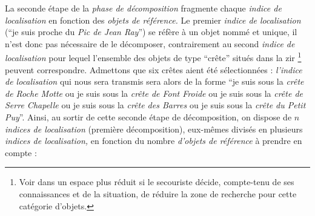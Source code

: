 La seconde étape de la \emph{phase de décomposition} fragmente chaque
\emph{indice de localisation} en fonction des \emph{objets de
  référence.} Le premier \emph{indice de localisation} (\enquote{je
  suis proche du \emph{Pic de Jean Ray}}) se réfère à un objet nommé
et unique, il n'est donc pas nécessaire de le décomposer,
contrairement au second \emph{indice de localisation} pour lequel
l'ensemble des objets de type \enquote{crête} situés dans la \ac{zir}
\footnote{Voir dans un espace plus réduit si le secouriste décide,
  compte-tenu de ses connaissances et de la situation, de réduire la
  zone de recherche pour cette catégorie d'objets.} peuvent
correspondre. Admettons que six crêtes aient été sélectionnées :
\emph{l'indice de localisation} qui nous sera transmis sera alors de
la forme \enquote{je suis sous la \emph{crête de Roche Motte} ou je
  suis sous la \emph{crête de Font Froide} ou je suis sous la
  \emph{crête de Serre Chapelle} ou je suis sous la \emph{crête des
    Barres} ou je suis sous la \emph{crête du Petit Puy}}. Ainsi, au
sortir de cette seconde étape de décomposition, on dispose de \(n\)
\emph{indices de localisation} (première décomposition), eux-mêmes
divisés en plusieurs \emph{indices de localisation,} en fonction du
nombre \emph{d'objets de référence} à prendre en compte :

\begin{quote}
\end{quote}

